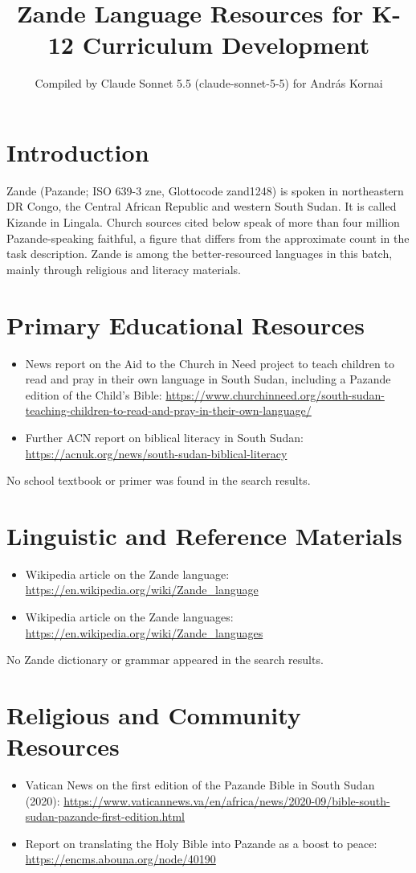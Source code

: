 \documentclass[12pt]{article}
\title{Zande Language Resources for K-12 Curriculum Development}
\author{Compiled by Claude Sonnet 5.5 (claude-sonnet-5-5) for Andr\'as Kornai}
\date{}
\begin{document}
\maketitle

\section{Introduction}
Zande (Pazande; ISO 639-3 zne, Glottocode zand1248) is spoken in northeastern DR Congo, the Central African Republic and western South Sudan. It is called Kizande in Lingala. Church sources cited below speak of more than four million Pazande-speaking faithful, a figure that differs from the approximate count in the task description. Zande is among the better-resourced languages in this batch, mainly through religious and literacy materials.

\section{Primary Educational Resources}
\begin{itemize}
\item News report on the Aid to the Church in Need project to teach children to read and pray in their own language in South Sudan, including a Pazande edition of the Child's Bible: \url{https://www.churchinneed.org/south-sudan-teaching-children-to-read-and-pray-in-their-own-language/}
\item Further ACN report on biblical literacy in South Sudan: \url{https://acnuk.org/news/south-sudan-biblical-literacy}
\end{itemize}
No school textbook or primer was found in the search results.

\section{Linguistic and Reference Materials}
\begin{itemize}
\item Wikipedia article on the Zande language: \url{https://en.wikipedia.org/wiki/Zande_language}
\item Wikipedia article on the Zande languages: \url{https://en.wikipedia.org/wiki/Zande_languages}
\end{itemize}
No Zande dictionary or grammar appeared in the search results.

\section{Religious and Community Resources}
\begin{itemize}
\item Vatican News on the first edition of the Pazande Bible in South Sudan (2020): \url{https://www.vaticannews.va/en/africa/news/2020-09/bible-south-sudan-pazande-first-edition.html}
\item Report on translating the Holy Bible into Pazande as a boost to peace: \url{https://encms.abouna.org/node/40190}
\end{itemize}
\end{document}
